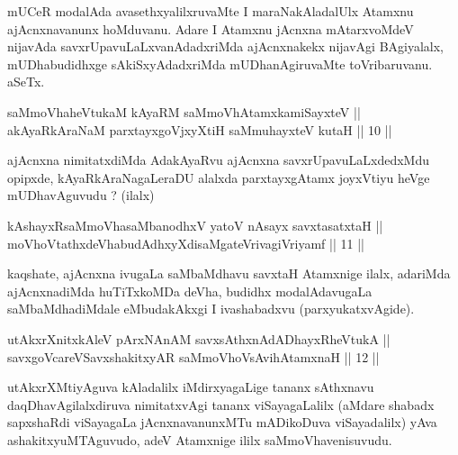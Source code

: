 \begin{artha}
mUCeR modalAda avasethxyalilxruvaMte I maraNakAladalUlx Atamxnu
ajAcnxnavanunx hoMduvanu. Adare I Atamxnu jAcnxna mAtarxvoMdeV
nijavAda savxrUpavuLaLxvanAdadxriMda ajAcnxnakekx nijavAgi BAgiyalalx,
mUDhabudidhxge sAkiSxyAdadxriMda mUDhanAgiruvaMte toVribaruvanu. aSeTx.
\end{artha}


\begin{shl}
saMmoVhaheVtukaM kAyaRM saMmoVhAtamxkamiSayxteV ||  \\
akAyaRkAraNaM parxtayxgoVjxyXtiH saMmuhayxteV kutaH \hfill || 10 ||
  
\end{shl}

\begin{artha}
ajAcnxna nimitatxdiMda AdakAyaRvu ajAcnxna savxrUpavuLaLxdedxMdu
opipxde, kAyaRkAraNagaLeraDU alalxda parxtayxgAtamx joyxVtiyu heVge
mUDhavAguvudu ? (ilalx)
\end{artha}

\begin{shl}
kAshayxRsaMmoVhasaMbanodhxV yatoV nAsayx savxtasatxtaH || \\
moVhoVtathxdeVhabudAdhxyXdisaMgateVrivagiVriyamf \hfill || 11 ||
 
\end{shl}

\begin{artha}
kaqshate, ajAcnxna ivugaLa saMbaMdhavu savxtaH Atamxnige ilalx,
adariMda ajAcnxnadiMda huTiTxkoMDa deVha, budidhx modalAdavugaLa
saMbaMdhadiMdale eMbudakAkxgi I ivashabadxvu (parxyukatxvAgide).
\end{artha}


\begin{shl}
utAkxrXnitxkAleV pArxNAnAM savxsAthxnAdADhayxRheVtukA || \\
savxgoVcareVSavxshakitxyAR saMmoVhoV\s sAvihA\s \s tamxnaH \hfill || 12 ||
  
\end{shl}

\begin{artha}
utAkxrXMtiyAguva kAladalilx iMdirxyagaLige tananx sAthxnavu
daqDhavAgilalxdiruva nimitatxvAgi tananx viSayagaLalilx (aMdare
shabadx sapxshaRdi viSayagaLa jAcnxnavanunxMTu mADikoDuva
viSayadalilx) yAva ashakitxyuMTAguvudo, adeV Atamxnige ililx
saMmoVhavenisuvudu.
\end{artha}

